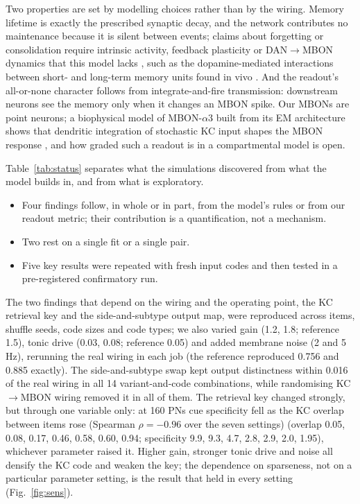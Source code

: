 \documentclass[conference]{IEEEtran}
\begin{document}
Two properties are set by modelling choices rather than by the wiring. Memory
lifetime is exactly the prescribed synaptic decay, and the network contributes
no maintenance because it is silent between events; claims about forgetting or
consolidation require intrinsic activity, feedback plasticity or
DAN$\rightarrow$MBON dynamics that this model lacks \cite{eschbach2020}, such
as the dopamine-mediated interactions between short- and long-term memory
units found in vivo \cite{huang2024}. And the
readout's all-or-none character follows from integrate-and-fire transmission:
downstream neurons see the memory only when it changes an MBON spike. Our MBONs
are point neurons; a biophysical model of MBON-$\alpha$3 built from its EM
architecture shows that dendritic integration of stochastic KC input shapes the
MBON response \cite{hafez2023}, and how graded such a readout is in a
compartmental model is open.

Table~\ref{tab:status} separates what the simulations discovered from what
the model builds in, and from what is exploratory.
\begin{itemize}
\item Four findings follow, in whole or in part, from the model's rules or from
our readout metric; their contribution is a quantification, not a mechanism.
\item Two rest on a single fit or a single pair.
\item Five key results were repeated with fresh input codes and then tested in
a pre-registered confirmatory run.
\end{itemize} The two findings that depend on the wiring
and the operating point, the KC retrieval key and the side-and-subtype output
map, were reproduced across items, shuffle seeds, code sizes and code types;
we also varied gain (1.2, 1.8; reference 1.5), tonic drive (0.03, 0.08;
reference 0.05) and added membrane noise (2 and 5\,Hz), rerunning the real
wiring in each job (the reference reproduced 0.756 and 0.885 exactly). The
side-and-subtype swap kept output distinctness within 0.016 of the real wiring
in all 14 variant-and-code combinations, while randomising KC$\rightarrow$MBON
wiring removed it in all of them. The retrieval key changed strongly, but
through one variable only: at 160 PNs cue specificity fell as the KC overlap
between items rose (Spearman $\rho=-0.96$ over the seven settings) (overlap 0.05, 0.08, 0.17, 0.46, 0.58, 0.60,
0.94; specificity 9.9, 9.3, 4.7, 2.8, 2.9, 2.0, 1.95), whichever parameter
raised it. Higher gain, stronger tonic drive and noise all densify the KC code
and weaken the key; the dependence on sparseness, not on a particular
parameter setting, is the result that held in every setting (Fig.~\ref{fig:sens}).
\end{document}
